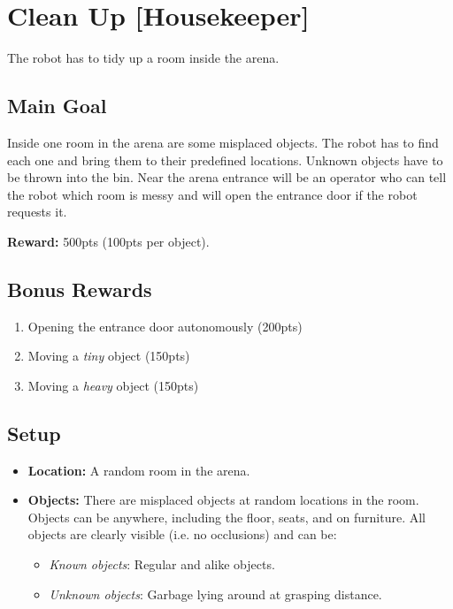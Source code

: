 \section{Clean Up [Housekeeper]}
The robot has to tidy up a room inside the arena.


\subsection{Main Goal}
Inside one room in the arena are some misplaced objects. The robot has to find each one and bring them to their predefined locations. Unknown objects have to be thrown into the bin. Near the arena entrance will be an operator who can tell the robot which room is messy and will open the entrance door if the robot requests it.

\noindent\textbf{Reward:} 500pts (100pts per object).

\subsection{Bonus Rewards}
\begin{enumerate}[nosep]
	\item Opening the entrance door autonomously (200pts)
	\item Moving a \emph{tiny} object (150pts)
	\item Moving a \emph{heavy} object (150pts)
\end{enumerate}


\subsection{Setup}
\begin{itemize}[nosep]
	\item \textbf{Location:} A random room in the arena.

	\item \textbf{Objects:} There are misplaced objects at random locations in the room.
	Objects can be anywhere, including the floor, seats, and on furniture.
	All objects are clearly visible (i.e. no occlusions) and can be:
	\begin{itemize}[nosep]
		\item\textit{Known objects}: Regular and alike objects.
		\item\textit{Unknown objects}: Garbage lying around at grasping distance.
	\end{itemize}
\end{itemize}

